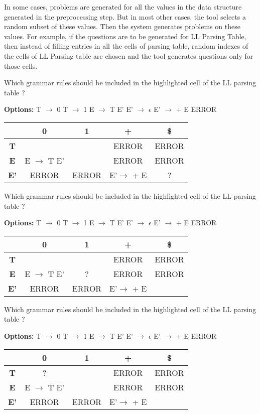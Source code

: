 In some cases, problems are generated for all the values in the data structure generated in the preprocessing step. But in most other cases, the tool selects a random subset of these values. Then the system generates problems on these values. For example, if the questions are to be generated for LL Parsing Table, then instead of filling entries in all the cells of parsing table, random indexes of the cells of LL Parsing table are chosen and the tool generates questions only for those cells.
\begin{example}
\label{ex:random number}
Which grammar rules should be included in the highlighted cell of the LL parsing table ?

\textbf{Options:} T $\to$ 0 \quad T $\to$ 1 \quad E $\to$ T E' \quad E' $\to$ $\epsilon$ \quad E' $\to$ + E \quad ERROR
\begin{center}
\begin{tabular}{ |c|c|c|c|c| } 
 \hline
  & \textbf{0} & \textbf{1} & \textbf{+} & \textbf{\$} \\
 \hline
 \textbf{T} &   &   & ERROR & ERROR \\
 \hline
 \textbf{E} & E $\to$ T E' &   & ERROR & ERROR \\
 \hline
 \textbf{E'} & ERROR & ERROR & E'$\to$ + E & ? \\
 \hline
\end{tabular}
\end{center}

Which grammar rules should be included in the highlighted cell of the LL parsing table ?

\textbf{Options:} T $\to$ 0 \quad T $\to$ 1 \quad E $\to$ T E' \quad E' $\to$ $\epsilon$ \quad E' $\to$ + E \quad ERROR
\begin{center}
\begin{tabular}{ |c|c|c|c|c| } 
 \hline
  & \textbf{0} & \textbf{1} & \textbf{+} & \textbf{\$} \\
 \hline
 \textbf{T} &   &   & ERROR & ERROR \\
 \hline
 \textbf{E} & E $\to$ T E' & ? & ERROR & ERROR \\
 \hline
 \textbf{E'} & ERROR & ERROR & E'$\to$ + E &  \\
 \hline
\end{tabular}
\end{center}

Which grammar rules should be included in the highlighted cell of the LL parsing table ?

\textbf{Options:} T $\to$ 0 \quad T $\to$ 1 \quad E $\to$ T E' \quad E' $\to$ $\epsilon$ \quad E' $\to$ + E \quad ERROR
\begin{center}
\begin{tabular}{ |c|c|c|c|c| } 
 \hline
  & \textbf{0} & \textbf{1} & \textbf{+} & \textbf{\$} \\
 \hline
 \textbf{T} & ? &   & ERROR & ERROR \\
 \hline
 \textbf{E} & E $\to$ T E' &   & ERROR & ERROR \\
 \hline
 \textbf{E'} & ERROR & ERROR & E'$\to$ + E &  \\
 \hline
\end{tabular}
\end{center}


\end{example}
